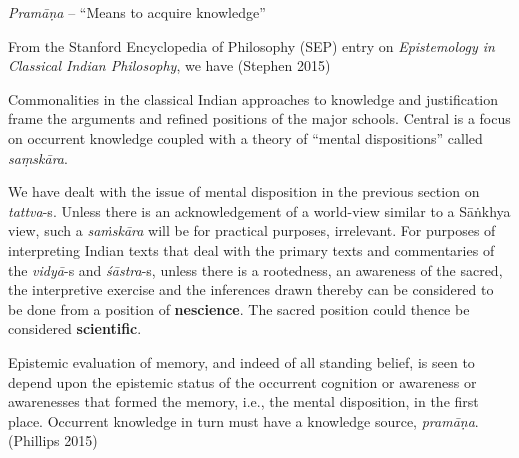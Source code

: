 {\sl Pramāṇa}  -- ``Means to acquire knowledge''

From the Stanford Encyclopedia of Philosophy (SEP) entry on {\sl Epistemology in Classical Indian Philosophy}, we have (Stephen 2015)
\begin{myquote}
Commonalities in the classical Indian approaches to knowledge and justification frame the arguments and refined positions of the major schools. Central is a focus on occurrent knowledge coupled with a theory of ``mental dispositions'' called {\sl saṃskāra}. 
\end{myquote}

We have dealt with the issue of mental disposition in the previous section on {\sl tattva}-s. Unless there is an acknowledgement of a world-view similar to a Sāṅkhya view, such a {\sl saṁskāra} will be for practical purposes, irrelevant. For purposes of interpreting Indian texts that deal with the primary texts and commentaries of the {\sl vidyā}-s and {\sl śāstra}-s, unless there is a rootedness, an awareness of the sacred, the interpretive exercise and the inferences drawn thereby can be considered to be done from a position of {\bf nescience}. The sacred position could thence be considered {\bf scientific}.
\begin{myquote}
Epistemic evaluation of memory, and indeed of all standing belief, is seen to depend upon the epistemic status of the occurrent cognition or awareness or awarenesses that formed the memory, i.e., the mental disposition, in the first place. Occurrent knowledge in turn must have a knowledge source, {\sl pramāṇa}.\hfill (Phillips 2015)
\end{myquote}


